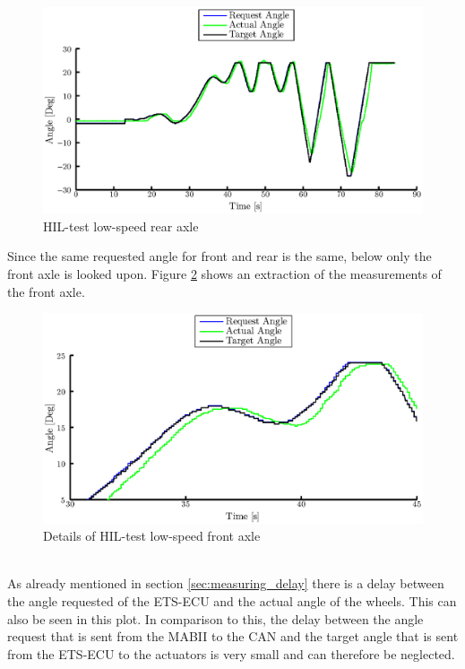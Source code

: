 \documentclass[ExampleMasters.tex]{subfiles}
\begin{document}
\begin{figure}[!htb]
	\centering
	\includegraphics[width=1\linewidth]{figures/HIL002_rear}
	\caption{HIL-test low-speed rear axle}
	
	\label{fig:HIL002_rear}
\end{figure}
Since the same requested angle for front and rear is the same, below only the front axle is looked upon.
Figure \ref{fig:HIL002_front_closeup} shows an extraction of the measurements of the front axle. 
\begin{figure}[!htb]
	\centering
	\includegraphics[width=1\linewidth]{figures/HIL002_front_closeup}
	\caption{Details of HIL-test low-speed front axle}
	
	\label{fig:HIL002_front_closeup}
\end{figure} \\
As already mentioned in section \ref{sec:measuring_delay} there is a delay between the angle requested of the ETS-ECU and the actual angle of the wheels. This can also be seen in this plot. In comparison to this, the delay between the angle request that is sent from the MABII to the CAN and the target angle that is sent from the ETS-ECU to the actuators is very small and can therefore be neglected.\\
\end{document}
